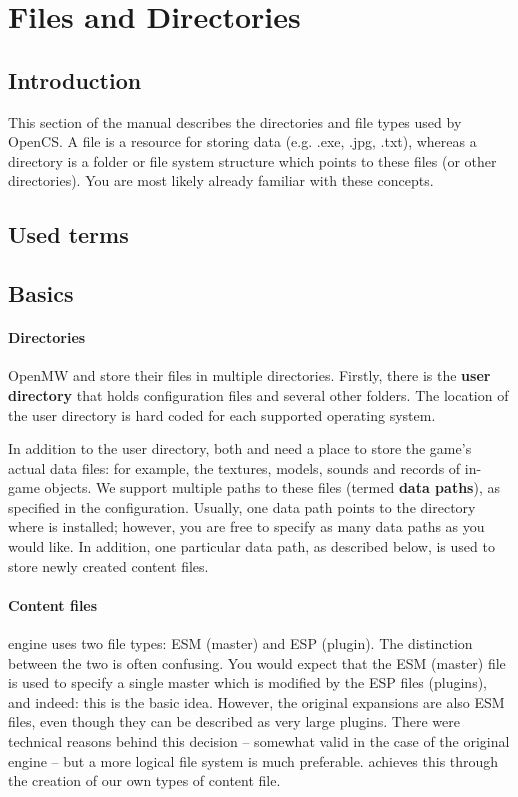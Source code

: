 \section{Files and Directories}
\subsection{Introduction}
This section of the manual describes the directories and file types used by OpenCS. A file is a resource for storing data (e.g. .exe, .jpg, .txt), 
whereas a directory is a folder or file system structure which points to these files (or other directories). You are most likely already familiar 
with these concepts.

\subsection{Used terms} %

\subsection{Basics}

\paragraph{Directories}
OpenMW and \OCS{} store their files in multiple directories. Firstly, there is the \textbf{user directory} that holds configuration
files and several other folders. The location of the user directory is hard coded for each supported operating system.

In addition to the user directory, both \OMW{} and \OCS{} need a place to store the game’s actual data files: for example, the
textures, models, sounds and records of in-game objects. We support multiple paths to these files (termed \textbf{data paths}),
as specified in the configuration. Usually, one data path points to the directory where \MW{} is installed; however, you are
free to specify as many data paths as you would like. In addition, one particular data path, as described below, is used to store
newly created content files.

\paragraph{Content files}
\BS{} \MW{} engine uses two file types: ESM (master) and ESP (plugin). The distinction between the two is often confusing.
You would expect that the ESM (master) file is used to specify a single master which is modified by the ESP files (plugins), and indeed:
this is the basic idea. However, the original expansions are also ESM files, even though they can be described as very large plugins.
There were technical reasons behind this decision -- somewhat valid in the case of the original engine -- but a more logical file system is
much preferable. \OMW{} achieves this through the creation of our own types of content file.


